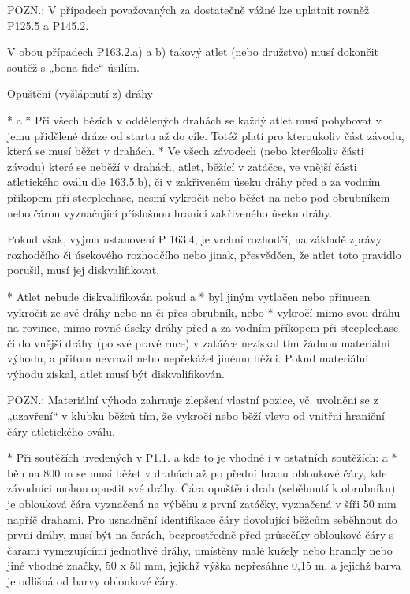   POZN.: V případech považovaných za dostatečně vážné lze uplatnit rovněž P125.5 a P145.2.
  \enditems

V obou případech P163.2.a) a b) takový atlet (nebo družstvo) musí dokončit soutěž s „bona fide“ úsilím.

Opuštění (vyšlápnutí z) dráhy

* \begitems \style a
  * Při všech bězích v oddělených drahách se každý atlet musí pohybovat v jemu přidělené dráze od startu až do cíle. Totéž platí pro kteroukoliv část závodu, která se musí běžet v drahách.
  * Ve všech závodech (nebo kterékoliv části závodu) které se neběží v drahách, atlet, běžící v zatáčce, ve vnější části atletického oválu dle 163.5.b), či v zakřiveném úseku dráhy před a za vodním příkopem při steeplechase, nesmí vykročit nebo běžet na nebo pod obrubníkem nebo čárou vyznačující příslušnou hranici zakřiveného úseku dráhy.
  \enditems

Pokud však, vyjma ustanovení P 163.4, je vrchní rozhodčí, na základě zprávy rozhodčího či úsekového rozhodčího nebo jinak, přesvědčen, že atlet toto pravidlo porušil, musí jej diskvalifikovat.

* Atlet nebude diskvalifikován pokud
  \begitems \style a
  * byl jiným vytlačen nebo přinucen vykročit ze své dráhy nebo na či přes obrubník, nebo
  * vykročí mimo svou dráhu na rovince, mimo rovné úseky dráhy před a za vodním příkopem při steeplechase či do vnější dráhy (po své pravé ruce) v zatáčce nezískal tím žádnou materiální výhodu, a přitom nevrazil nebo nepřekážel jinému běžci. Pokud materiální výhodu získal, atlet musí být diskvalifikován.

  POZN.: Materiální výhoda zahrnuje zlepšení vlastní pozice, vč. uvolnění se z „uzavření“ v klubku běžců tím, že vykročí nebo běží vlevo od vnitřní hraniční čáry atletického oválu.
  \enditems

* Při soutěžích uvedených v P1.1. a kde to je vhodné i v ostatních soutěžích:
  \begitems \style a
  * běh na 800 m se musí běžet v drahách až po přední hranu obloukové čáry, kde závodníci mohou opustit své dráhy. Čára opuštění drah (seběhnutí k obrubníku) je oblouková čára vyznačená na výběhu z první zatáčky, vyznačená v šíři 50 mm napříč drahami. Pro usnadnění identifikace čáry dovolující běžcům seběhnout do první dráhy, musí být na čarách, bezprostředně před průsečíky obloukové čáry s čarami vymezujícími jednotlivé dráhy, umístěny malé kužely nebo hranoly nebo jiné vhodné značky, 50 x 50 mm, jejichž výška nepřesáhne 0,15 m, a jejichž barva je odlišná od barvy obloukové čáry.

